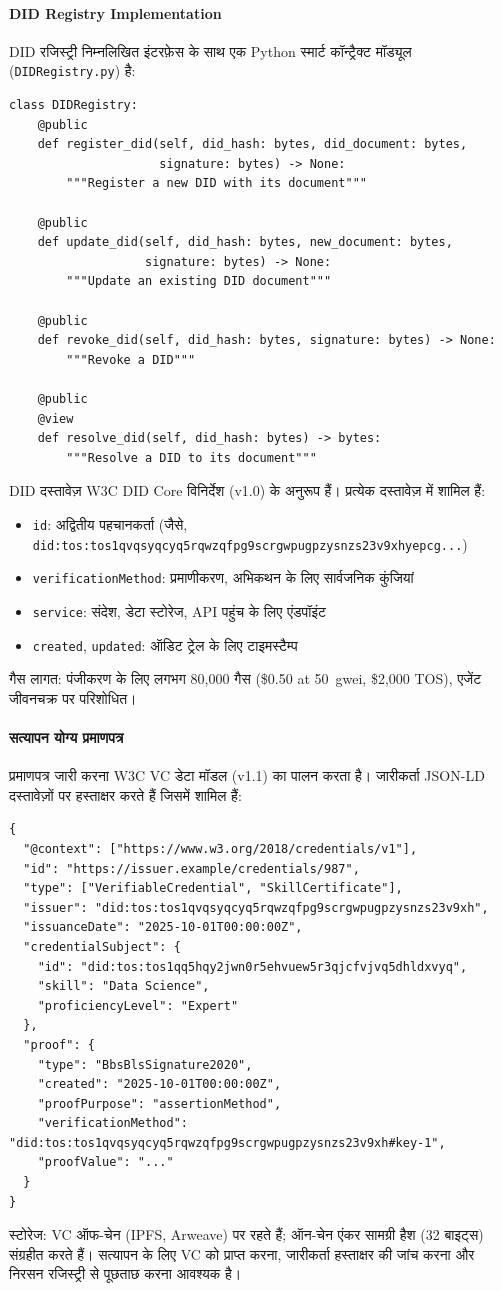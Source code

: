 \documentclass[11pt]{article}
\begin{document}
\paragraph{DID Registry Implementation} DID रजिस्ट्री निम्नलिखित इंटरफ़ेस के साथ एक Python स्मार्ट कॉन्ट्रैक्ट मॉड्यूल (\texttt{DIDRegistry.py}) है:
\begin{verbatim}
class DIDRegistry:
    @public
    def register_did(self, did_hash: bytes, did_document: bytes,
                     signature: bytes) -> None:
        """Register a new DID with its document"""

    @public
    def update_did(self, did_hash: bytes, new_document: bytes,
                   signature: bytes) -> None:
        """Update an existing DID document"""

    @public
    def revoke_did(self, did_hash: bytes, signature: bytes) -> None:
        """Revoke a DID"""

    @public
    @view
    def resolve_did(self, did_hash: bytes) -> bytes:
        """Resolve a DID to its document"""
\end{verbatim}
DID दस्तावेज़ W3C DID Core विनिर्देश (v1.0) के अनुरूप हैं। प्रत्येक दस्तावेज़ में शामिल हैं:
\begin{itemize}[noitemsep]
  \item \texttt{id}: अद्वितीय पहचानकर्ता (जैसे, \texttt{did:tos:tos1qvqsyqcyq5rqwzqfpg9scrgwpugpzysnzs23v9xhyepcg...})
  \item \texttt{verificationMethod}: प्रमाणीकरण, अभिकथन के लिए सार्वजनिक कुंजियां
  \item \texttt{service}: संदेश, डेटा स्टोरेज, API पहुंच के लिए एंडपॉइंट
  \item \texttt{created}, \texttt{updated}: ऑडिट ट्रेल के लिए टाइमस्टैम्प
\end{itemize}
गैस लागत: पंजीकरण के लिए लगभग 80,000 गैस (\$0.50 at 50~gwei, \$2,000 TOS), एजेंट जीवनचक्र पर परिशोधित।

\paragraph{सत्यापन योग्य प्रमाणपत्र} प्रमाणपत्र जारी करना W3C VC डेटा मॉडल (v1.1) का पालन करता है। जारीकर्ता JSON-LD दस्तावेज़ों पर हस्ताक्षर करते हैं जिसमें शामिल हैं:
\begin{verbatim}
{
  "@context": ["https://www.w3.org/2018/credentials/v1"],
  "id": "https://issuer.example/credentials/987",
  "type": ["VerifiableCredential", "SkillCertificate"],
  "issuer": "did:tos:tos1qvqsyqcyq5rqwzqfpg9scrgwpugpzysnzs23v9xh",
  "issuanceDate": "2025-10-01T00:00:00Z",
  "credentialSubject": {
    "id": "did:tos:tos1qq5hqy2jwn0r5ehvuew5r3qjcfvjvq5dhldxvyq",
    "skill": "Data Science",
    "proficiencyLevel": "Expert"
  },
  "proof": {
    "type": "BbsBlsSignature2020",
    "created": "2025-10-01T00:00:00Z",
    "proofPurpose": "assertionMethod",
    "verificationMethod": "did:tos:tos1qvqsyqcyq5rqwzqfpg9scrgwpugpzysnzs23v9xh#key-1",
    "proofValue": "..."
  }
}
\end{verbatim}
स्टोरेज: VC ऑफ-चेन (IPFS, Arweave) पर रहते हैं; ऑन-चेन एंकर सामग्री हैश (32 बाइट्स) संग्रहीत करते हैं। सत्यापन के लिए VC को प्राप्त करना, जारीकर्ता हस्ताक्षर की जांच करना और निरसन रजिस्ट्री से पूछताछ करना आवश्यक है।
\end{document}
